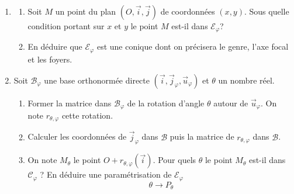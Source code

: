 \begin{enumerate}
 \item
\begin{enumerate}
\item Soit $M$ un point du plan $(O,\overrightarrow{i},\overrightarrow{j})$ de coordonnées $(x,y)$. Sous quelle condition portant sur $x$ et $y$ le point $M$ est-il dans $\mathcal{E}_\varphi$?
\item En déduire que $\mathcal{E}_\varphi$ est une conique dont on précisera le genre, l'axe focal et les foyers.
\end{enumerate}
\item Soit $\mathcal{B}_\varphi$ une base orthonormée directe $(\overrightarrow{i},\overrightarrow{j}_\varphi,\overrightarrow{u}_\varphi)$ et $\theta$ un nombre réel.
\begin{enumerate}
 \item Former la matrice dans $\mathcal{B}_\varphi$ de la rotation d'angle $\theta$ autour de $\overrightarrow{u}_\varphi$. On note $r_{\theta,\varphi}$ cette rotation.
 \item Calculer les coordonnées de $\overrightarrow{j}_\varphi$ dans $\mathcal{B}$ puis la matrice de $r_{\theta,\varphi}$ dans $\mathcal{B}$.
 \item On note $M_\theta$ le point $O+r_{\theta,\varphi}(\overrightarrow{i})$. Pour quels $\theta$ le point $M_\theta$ est-il dans $\mathcal{C}_\varphi$ ? En déduire une paramétrisation de $\mathcal{E}_\varphi$
\begin{displaymath}
 \theta \rightarrow P_\theta
\end{displaymath}
\end{enumerate}

\end{enumerate}

